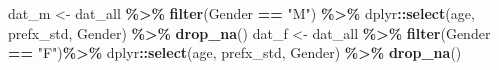\documentclass[
]{article}
\newenvironment{Shaded}{\begin{snugshade}}{\end{snugshade}}
\newcommand{\FunctionTok}[1]{\textcolor[rgb]{0.13,0.29,0.53}{\textbf{#1}}}
\newcommand{\NormalTok}[1]{#1}
\newcommand{\OtherTok}[1]{\textcolor[rgb]{0.56,0.35,0.01}{#1}}
\newcommand{\SpecialCharTok}[1]{\textcolor[rgb]{0.81,0.36,0.00}{\textbf{#1}}}
\newcommand{\StringTok}[1]{\textcolor[rgb]{0.31,0.60,0.02}{#1}}
\begin{document}
\begin{Shaded}
\begin{Highlighting}[]
\NormalTok{dat\_m }\OtherTok{\textless{}{-}}\NormalTok{ dat\_all }\SpecialCharTok{\%\textgreater{}\%} \FunctionTok{filter}\NormalTok{(Gender }\SpecialCharTok{==} \StringTok{"M"}\NormalTok{) }\SpecialCharTok{\%\textgreater{}\%}\NormalTok{  dplyr}\SpecialCharTok{::}\FunctionTok{select}\NormalTok{(age, prefx\_std, Gender) }\SpecialCharTok{\%\textgreater{}\%} \FunctionTok{drop\_na}\NormalTok{()}
\NormalTok{dat\_f }\OtherTok{\textless{}{-}}\NormalTok{ dat\_all }\SpecialCharTok{\%\textgreater{}\%}  \FunctionTok{filter}\NormalTok{(Gender }\SpecialCharTok{==} \StringTok{"F"}\NormalTok{)}\SpecialCharTok{\%\textgreater{}\%}\NormalTok{ dplyr}\SpecialCharTok{::}\FunctionTok{select}\NormalTok{(age, prefx\_std, Gender) }\SpecialCharTok{\%\textgreater{}\%} \FunctionTok{drop\_na}\NormalTok{()}



\end{Highlighting}
\end{Shaded}
\end{document}
